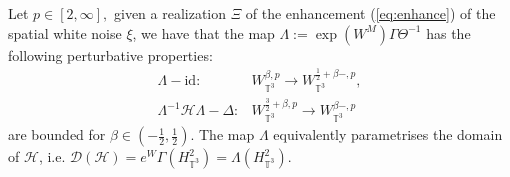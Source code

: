 \begin{lem}
  \label{lem:Lambda}Let $p \in [2, \infty],$ given a realization $\Xi$ of the
  enhancement (\ref{eq:enhance}) of the spatial white noise $\xi$, we have
  that the map $\Lambda := \exp (W^M) \Gamma \Theta^{- 1}$ has the
  following perturbative properties:
  \begin{eqnarray}
    \Lambda - \mathrm{id} : & W_{\mathbb{T}^3}^{\beta, p} {\rightarrow
    W_{\mathbb{T}^3}^{\frac{1}{2} + \beta -, p}} ,  \label{eq:diff-G-id}\\
    \Lambda^{- 1} \mathcal{H} \Lambda - \Delta : &
    W_{\mathbb{T}^3}^{\frac{3}{2} + \beta, p} {\rightarrow
    W_{\mathbb{T}^3}^{\beta -, p}}   \label{eq:diff-HeWG-Lap}
  \end{eqnarray}
  are bounded for $\beta \in \left( - \frac{1}{2}, \frac{1}{2} \right)$. The
  map $\Lambda$ equivalently parametrises the domain of $\mathcal{H}$, i.e.
  $\mathcal{D} (\mathcal{H}) = e^W \Gamma (H_{\mathbb{T}^3}^2) = \Lambda
  (H_{\mathbb{T}^3}^2)$.
\end{lem}

